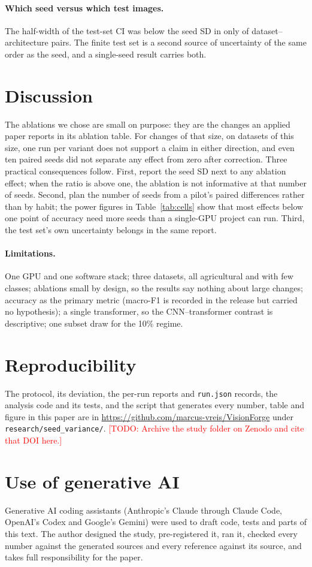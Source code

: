 \documentclass[10pt]{article}
\newcommand{\todo}[1]{\textcolor{red}{[TODO: #1]}}
\begin{document}
\paragraph{Which seed versus which test images.} The half-width of the test-set
CI was below the seed SD in only \NEvalBelow{} of \NPairs{}
dataset--architecture pairs. The finite test set is a second source of
uncertainty of the same order as the seed, and a single-seed result carries
both.

\section{Discussion}\label{sec:discussion}

The ablations we chose are small on purpose: they are the changes an applied
paper reports in its ablation table. For changes of that size, on datasets of
this size, one run per variant does not support a claim in either direction,
and even ten paired seeds did not separate any effect from zero after
correction. Three practical consequences follow. First, report the seed SD next
to any ablation effect; when the ratio is above one, the ablation is not
informative at that number of seeds. Second, plan the number of seeds from a
pilot's paired differences rather than by habit; the power figures in
Table~\ref{tab:cells} show that most effects below one point of accuracy need
more seeds than a single-GPU project can run. Third, the test set's own uncertainty
belongs in the same report.

\paragraph{Limitations.} One GPU and one software stack; three datasets, all
agricultural and with few classes; ablations small by design, so the results
say nothing about large changes; accuracy as the primary metric (macro-F1 is
recorded in the release but carried no hypothesis); a single transformer, so
the CNN--transformer contrast is descriptive; one subset draw for the 10\%
regime.

\section*{Reproducibility}
The protocol, its deviation, the per-run reports and \texttt{run.json} records,
the analysis code and its tests, and the script that generates every number,
table and figure in this paper are in
\url{https://github.com/marcus-vreis/VisionForge} under
\texttt{research/seed\_variance/}. \todo{Archive the study folder on Zenodo and
cite that DOI here.}

\section*{Use of generative AI}
Generative AI coding assistants (Anthropic's Claude through Claude Code,
OpenAI's Codex and Google's Gemini) were used to draft code, tests and parts of
this text. The author designed the study, pre-registered it, ran it, checked
every number against the generated sources and every reference against its
source, and takes full responsibility for the paper.



\end{document}
